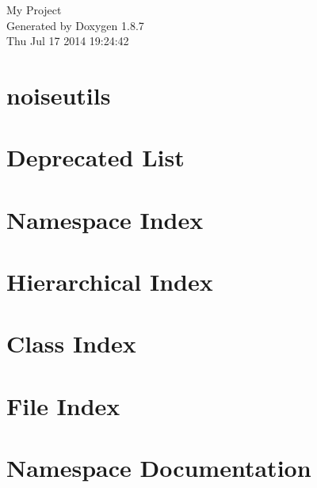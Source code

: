 \documentclass[twoside]{book}
\newcommand{\+}{\discretionary{\mbox{\scriptsize$\hookleftarrow$}}{}{}}
\newcommand{\clearemptydoublepage}{%
  \newpage{\pagestyle{empty}\cleardoublepage}%
}
\begin{document}
\hypersetup{pageanchor=false,
             bookmarks=true,
             bookmarksnumbered=true,
             pdfencoding=unicode
            }
\begin{titlepage}
\vspace*{7cm}
\begin{center}%
{\Large My Project }\\
\vspace*{1cm}
{\large Generated by Doxygen 1.8.7}\\
\vspace*{0.5cm}
{\small Thu Jul 17 2014 19:24:42}\\
\end{center}
\end{titlepage}
\clearemptydoublepage
\tableofcontents
\clearemptydoublepage
{}
\hypersetup{pageanchor=true}

\chapter{noiseutils}
\label{index}\hypertarget{index}{}
\chapter{Deprecated List}
\label{deprecated}
\hypertarget{deprecated}{}

\chapter{Namespace Index}

\chapter{Hierarchical Index}

\chapter{Class Index}

\chapter{File Index}

\chapter{Namespace Documentation}








\end{document}
